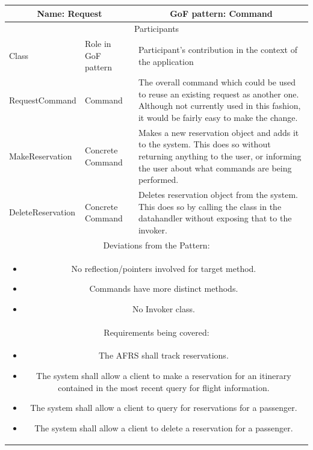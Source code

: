 \begin{center}
    \begin{tabular}{ |p{4cm}|p{4cm}|p{7cm}|  }
        \hline
        \multicolumn{2}{|c|}{Name: Request} & \multicolumn{1}{|c|}{GoF pattern: Command} \\
        \hline
        \multicolumn{3}{|c|}{Participants} \\
        \hline
        Class & Role in GoF pattern & Participant's contribution in the context of the application \\
        \hline \hline
        RequestCommand & Command & The overall command which could be used to reuse an existing request as another one.
        Although not currently used in this fashion, it would be fairly easy to make the change. \\
        \hline
        MakeReservation & Concrete Command & Makes a new reservation object and adds it to the system.
        This does so without returning anything to the user, or informing the user about what commands are being performed. \\
        \hline
        DeleteReservation & Concrete Command & Deletes reservation object from the system.
        This does so by calling the class in the datahandler without exposing that to the invoker. \\
        \hline
        \hline
        \multicolumn{3}{|c|}{Deviations from the Pattern:} \\ \multicolumn{3}{|c|}{\parbox{0.9\textwidth}{
        \begin{itemize}
            \item No reflection/pointers involved for target method.
            \item Commands have more distinct methods.
            \item No Invoker class.
        \end{itemize} }} \\
        \hline
        \multicolumn{3}{|c|}{Requirements being covered:} \\ \multicolumn{3}{|c|}{\parbox{0.9\textwidth}{
        \begin{itemize}
            \item The AFRS shall track reservations.
            \item The system shall allow a client to make a reservation for an itinerary contained in the most recent query for flight information.
            \item The system shall allow a client to query for reservations for a passenger.
            \item The system shall allow a client to delete a reservation for a passenger.
        \end{itemize} }} \\
        \hline
    \end{tabular}
\end{center}

